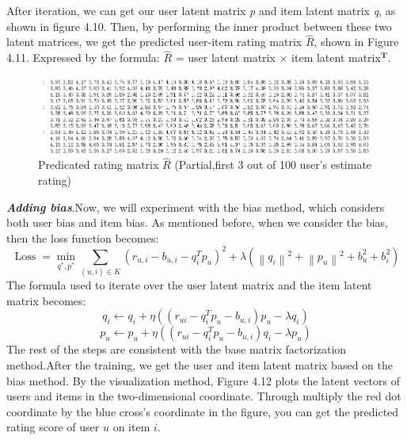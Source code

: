 After iteration, we can get our user latent matrix \textit{p} and item latent matrix \textit{q}, as shown in figure 4.10. Then, by performing the inner product between these two latent matrices, we get the predicted user-item rating matrix $\hat{R}$, shown in Figure 4.11. Expressed by the formula: $\hat{R}$ = user latent matrix $\times$ item latent matrix$^\textbf{T}$.
\begin{figure}[htbp]
\centering
\includegraphics[scale =0.7]{figure/result1.png}
\caption{Predicated rating matrix $\hat{R}$ (Partial,first 3 out of 100 user's estimate rating)}
\end{figure}

\textbf{\textit{Adding bias}}.Now, we will experiment with the bias method, which considers both user bias and item bias. As mentioned before, when we consider the bias, then the loss function becomes:
\begin{equation}
    \operatorname{Loss}=\min _{q^{*}, p^{*}} \sum_{(u, i) \in K}\left(r_{u,i}-b_{u,i}-q_{i}^{T}p_{u}\right)^{2}+\lambda \left(\left\|q_{i}\right\|^{2}+\left\|p_{u}\right\|^{2}+b_{u}^{2}+b_{i}^{2}\right)
\end{equation}
The formula used to iterate over the user latent matrix and the item latent matrix becomes:
\begin{equation}
    q_{i} \leftarrow q_{i}+\eta\left(\left ( r_{u i}-q_{i}^{T} p_{u}-b_{u,i} \right ) p_{u}-\lambda q_{i}\right)
\end{equation}
\begin{equation}
    p_{u} \leftarrow p_{u}+\eta\left(\left ( r_{u i}-q_{i}^{T} p_{u}-b_{u,i} \right ) q_{i}-\lambda p_{u}\right)
\end{equation}
The rest of the steps are consistent with the base matrix factorization method.After the training, we get the user and item latent matrix based on the bias method. By the visualization method, Figure 4.12 plots the latent vectors of users and items in the two-dimensional coordinate. Through multiply the red dot coordinate by the blue cross’s coordinate in the figure, you can get the predicted rating score of user $u$ on item $i$.

